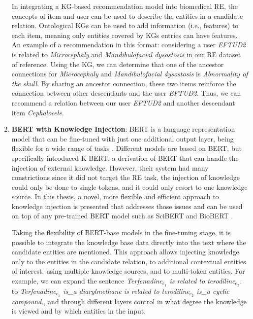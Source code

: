 \begin{enumerate}
    In integrating a KG-based recommendation model into biomedical RE, the concepts of item and user can be used to describe the entities in a candidate relation. Ontological KGs can be used to add information (i.e., features) to each item, meaning only entities covered by KGs entries can have features. An example of a recommendation in this format: considering a user \textit{EFTUD2} is related to \textit{Microcephaly} and \textit{Mandibulofacial dysostosis} in our RE dataset of reference. Using the KG, we can determine that one of the ancestor connections for \textit{Microcephaly} and \textit{Mandibulofacial dysostosis} is \textit{Abnormality of the skull}. By sharing an ancestor connection, these two items reinforce the connection between other descendants and the user \textit{EFTUD2}. Thus, we can recommend a relation between our user \textit{EFTUD2} and another descendant item \textit{Cephalocele}.
    
    \item \textbf{BERT with Knowledge Injection}: BERT is a language representation model that can be fine-tuned with just one additional output layer, being flexible for a wide range of tasks \citep{devlin2019bert}. Different models are based on BERT, but \cite{liu2020k} specifically introduced K-BERT, a derivation of BERT that can handle the injection of external knowledge. However, their system had many constrictions since it did not target the RE task, the injection of knowledge could only be done to single tokens, and it could only resort to one knowledge source. In this thesis, a novel, more flexible and efficient approach to knowledge injection is presented that addresses those issues and can be used on top of any pre-trained BERT model such as SciBERT \citep{scibert} and BioBERT \citep{lee2020biobert}. 
    
    Taking the flexibility of BERT-base models in the fine-tuning stage, it is possible to integrate the knowledge base data directly into the text where the candidate entities are mentioned. This approach allows injecting knowledge only to the entities in the candidate relation, to additional contextual entities of interest, using multiple knowledge sources, and to multi-token entities. For example, we can expand the sentence \textit{Terfenadine$_{e_{1}}$ is related to terodiline$_{e_{2}}$.} to \textit{Terfenadine$_{e_{1}}$ is\_a diarylmethane is related to terodiline$_{e_{2}}$ is\_a cyclic compound.}, and through different layers control in what degree the knowledge is viewed and by which entities in the input.   
\end{enumerate}

